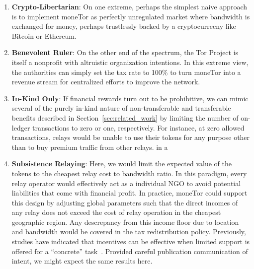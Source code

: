 \begin{enumerate}

\item \textbf{Crypto-Libertarian}: On one extreme, perhaps the simplest naive
approach is to implement moneTor as perfectly unregulated market where bandwidth
is exchanged for money, perhaps trustlessly backed by a cryptocurrecny like
Bitcoin or Ethereum.

\item \textbf{Benevolent Ruler}: On the other end of the spectrum, the Tor
Project is itself a nonprofit with altruistic organization intentions. In this
extreme view, the authorities can simply set the tax rate to 100\% to turn
moneTor into a revenue stream for centralized efforts to improve the network.

\item \textbf{In-Kind Only}: If financial rewards turn out to be
  prohibitive, we can mimic several of the purely in-kind nature of
  non-transferable and transferable benefits described in
  Section~\ref{sec:related_work} by limiting the number of on-ledger
  transactions to zero or one, respectively. For instance, at zero
  allowed transactions, relays would be unable to use their tokens for
  any purpose other than to buy premium traffic from other relays. in a

\item \textbf{Subsistence Relaying}: Here, we would limit the expected
  value of the tokens to the cheapest relay cost to bandwidth
  ratio. In this paradigm, every relay operator would effectively act
  as a individual NGO to avoid potential liabilities that come with
  financial profit. In practice, moneTor could support this design by
  adjusting global parameters such that the direct incomes of any
  relay does not exceed the cost of relay operation in the cheapest
  geographic region. Any descrepancy from this income floor due to
  location and bandwidth would be covered in the tax redistribution
  policy. Previously, studies have indicated that incentives can be
  effective when limited support is offered for a ``concrete''
  task~\cite{10.1257/jep.25.4.191, 10.1086/431263}. Provided careful
  publication communication of intent, we might expect the same
  results here.


\end{enumerate}
